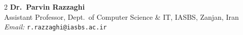 \documentclass[
	8pt, %
]{FreemanCV}
\begin{document}
\begin{paracol}{2}
    \textbf{Dr.\ Parvin Razzaghi}\\
    Assistant Professor, Dept.\ of Computer Science \& IT, IASBS, Zanjan, Iran\\
    \textit{Email:} \texttt{r.razzaghi@iasbs.ac.ir}\\




\end{paracol} %

\end{document}
